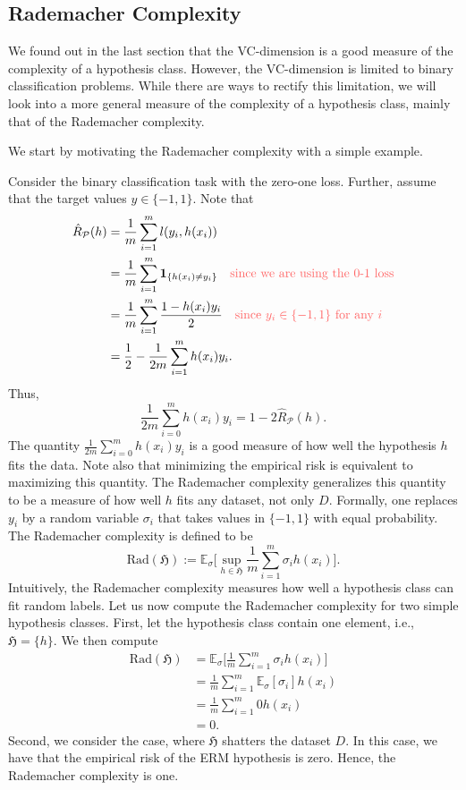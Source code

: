 \subsection{Rademacher Complexity}
We found out in the last section that the VC-dimension is a good measure of the
complexity of a hypothesis class. However, the VC-dimension is limited to binary
classification problems. While there are ways to rectify this limitation, we
will look into 	 a more general measure of the complexity of a hypothesis class,
mainly that of the Rademacher complexity. 

We start by motivating the Rademacher complexity with a simple example. 

Consider the binary classification task with the zero-one loss. Further, assume
that the target values $y \in \{-1,1\}$. Note that 
\begin{align*}
	\hat{R}_\mathcal{P}(h) &= \frac{1}{m} \sum_{i=1}^m l(y_i, h(x_i)) \\
	&= \frac{1}{m} \sum_{i=1}^{m} \mathbf{1}_{\{h(x_i) \neq y_i\}} \quad \text{\color{mildred} since we are using the 0-1 loss} \\  	
	& = \frac{1}{m} \sum_{i=1}^{m} \frac{1- h(x_i)y_i}{2} \quad \text{\color{mildred} since $y_i \in \{-1,1\}$ for any $i$}\\
	& = \frac{1}{2} - \frac{1}{2m} \sum_{i=1}^{m} h(x_i)y_i.
\end{align*}
Thus,
$$
\frac{1}{2m} \sum_{i=0}^{m} h(x_i)y_i = 1 - 2 \hat{R}_\mathcal{P}(h).
$$
The quantity $\frac{1}{2m} \sum_{i=0}^{m} h(x_i)y_i$ is a good measure of how
well the hypothesis $h$ fits the data. Note also that minimizing the empirical
risk is equivalent to maximizing this quantity. The Rademacher complexity
generalizes this quantity to be a measure of how well $h$ fits any dataset, not
only $D$. Formally, one replaces $y_i$ by a random variable $\sigma_i$ that
 takes values in $\{-1,1\}$ with equal probability. The Rademacher complexity
is defined to be
$$
\text{Rad}(\mathfrak{H}) := \mathbb{E}_{\sigma} \bigl[ \sup_{h \in \mathfrak{H}} \frac{1}{m} \sum_{i=1}^{m} \sigma_i h(x_i) \bigr].
$$
Intuitively, the Rademacher complexity measures how well a hypothesis class can
fit random labels. Let us now compute the Rademacher complexity for two simple hypothesis classes.
First, let the
hypothesis class contain one element, i.e., $\mathfrak{H} = \{h\}$. We then
compute 
\begin{align*}
	\text{Rad}(\mathfrak{H}) &= \mathbb{E}_{\sigma} \bigl[ \frac{1}{m} \sum_{i=1}^{m} \sigma_i h(x_i) \bigr] \\
	&= \frac{1}{m} \sum_{i=1}^{m} \mathbb{E}_{\sigma}[\sigma_i] h(x_i)\\
	&= \frac{1}{m} \sum_{i=1}^{m} 0 h(x_i)\\
	&= 0.
\end{align*}
Second, we consider the case, where $\mathfrak{H}$ shatters the dataset $D$. In this
case, we have that the empirical risk of the ERM hypothesis is zero. Hence, the
Rademacher complexity is one.

